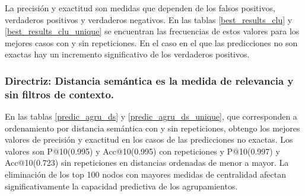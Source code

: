 La precisión y exactitud son medidas que dependen de los falsos positivos, verdaderos positivos y verdaderos negativos. En las  tablas \ref{best_results_clu} y \ref{best_results_clu_unique} se encuentran las frecuencias de estos valores para los mejores casos con y sin repeticiones. En el caso en el que las predicciones no son exactas  hay un incremento significativo de los verdaderos positivos.

\subsubsection{Directriz: Distancia semántica es la medida de relevancia y sin filtros de contexto.}

En las tablas \ref{predic_agru_ds} y \ref{predic_agru_ds_unique}, que corresponden a ordenamiento por distancia semántica con y sin repeticiones,  obtengo los mejores valores de precisión y exactitud en los casos de las predicciones no exactas. Los valores son  P@10(\num{0,995}) y Acc@10(\num{0,995}) con repeticiones y P@10(\num{0,997}) y Acc@10(\num{0,723}) sin repeticiones en distancias ordenadas de menor a mayor. La eliminación de los top 100 nodos con mayores medidas de centralidad afectan significativamente la capacidad predictiva de los agrupamientos. 


